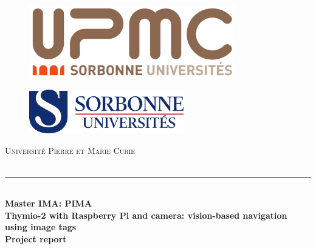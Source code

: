 \documentclass[a4paper]{report}
\begin{document}
\newcommand{\HRule}{\rule{\linewidth}{0.6mm}}

\begin{titlepage}
\begin{center}


\begin{figure}[h]
    \begin{minipage}[c]{.46\linewidth}
        \centering
\includegraphics[width=0.8\textwidth]{./logo_upmc_sorbonne.png}~\\[1cm]
  
    \end{minipage}
    \hfill%
    \begin{minipage}[c]{.46\linewidth}
        \centering
\includegraphics[width=0.6\textwidth]{./logo-sorbonne.png}~\\[1cm]

    \end{minipage}
\end{figure}

\textsc{\LARGE Université Pierre et Marie Curie}\\[2cm]

\textsc{\Large }\\[0.7cm]

\vspace{2cm}
\HRule \\[0.4cm]

{\huge \bfseries Master IMA: PIMA\\

\huge \bfseries  Thymio-2 with Raspberry Pi and camera: vision-based navigation using image tags\\
\vspace{1cm}
Project report
\\[0.4cm] }


\end{center}
\end{titlepage}
\end{document}

